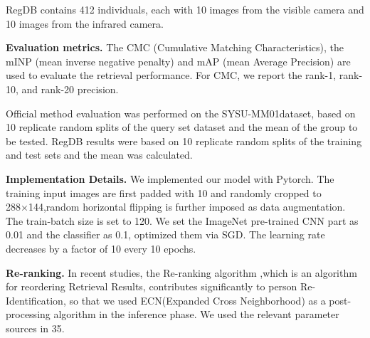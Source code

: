 \documentclass[journal]{IEEEtran}
\begin{document}
RegDB\textsuperscript{\cite{nguyen2017person}} contains 412 individuals, each with 10 images from the visible camera and 10 images from the infrared camera.

\textbf{Evaluation metrics.} 
The CMC (Cumulative Matching Characteristics), the mINP (mean inverse negative penalty) and mAP (mean Average Precision) are used to evaluate the retrieval performance. For CMC, we report the rank-1, rank-10, and rank-20 precision.

Official method evaluation was performed on the SYSU-MM01dataset, based on 10 replicate random splits of the query set dataset and the mean of the group to be tested. RegDB results were based on 10 replicate random splits of the training and test sets and the mean was calculated.

\textbf{Implementation Details.} 
We implemented our model with Pytorch. The training input images are first padded with 10 and randomly cropped to 288×144,random horizontal flipping is further imposed as data augmentation. The train-batch size is set to 120.  We set the ImageNet pre-trained CNN part as 0.01 and the classifier as 0.1, optimized them via SGD. The learning rate decreases by a factor of 10 every 10 epochs.

\textbf{Re-ranking.} 
In recent studies\textsuperscript{\cite{zhang2017alignedreid,basaran2020efficient,sarfraz2018pose}}, the Re-ranking algorithm ,which is an algorithm for reordering Retrieval Results, contributes significantly to person Re-Identification, so that we used ECN\textsuperscript{\cite{sarfraz2018pose}}(Expanded Cross Neighborhood) as a post-processing algorithm in the inference phase. We used the relevant parameter sources in 35.
\end{document}
